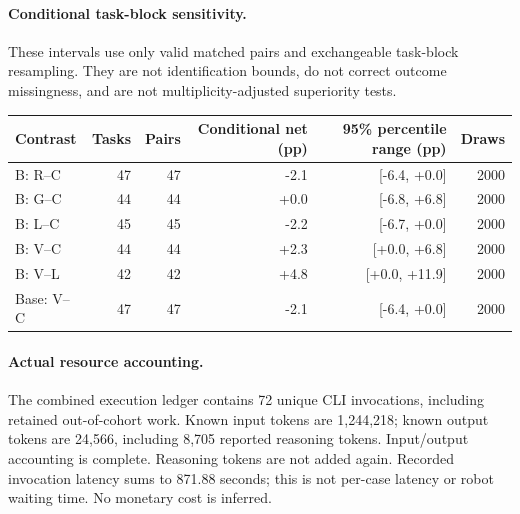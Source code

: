 \paragraph{Conditional task-block sensitivity.} These intervals use only valid matched pairs and exchangeable task-block resampling. They are not identification bounds, do not correct outcome missingness, and are not multiplicity-adjusted superiority tests.

\begin{tabular}{@{}lrrrrr@{}}
\toprule
Contrast & Tasks & Pairs & Conditional net (pp) & 95\% percentile range (pp) & Draws\\
\midrule
B: R--C & 47 & 47 & -2.1 & [-6.4, +0.0] & 2000\\
B: G--C & 44 & 44 & +0.0 & [-6.8, +6.8] & 2000\\
B: L--C & 45 & 45 & -2.2 & [-6.7, +0.0] & 2000\\
B: V--C & 44 & 44 & +2.3 & [+0.0, +6.8] & 2000\\
B: V--L & 42 & 42 & +4.8 & [+0.0, +11.9] & 2000\\
Base: V--C & 47 & 47 & -2.1 & [-6.4, +0.0] & 2000\\
\bottomrule
\end{tabular}


\paragraph{Actual resource accounting.} The combined execution ledger contains 72 unique CLI invocations, including retained out-of-cohort work. Known input tokens are 1,244,218; known output tokens are 24,566, including 8,705 reported reasoning tokens. Input/output accounting is complete. Reasoning tokens are not added again. Recorded invocation latency sums to 871.88 seconds; this is not per-case latency or robot waiting time. No monetary cost is inferred.
